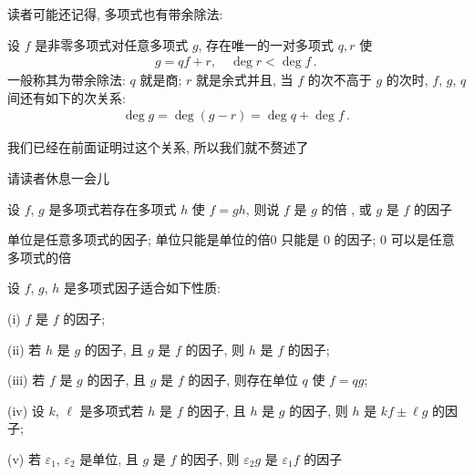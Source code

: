 读者可能还记得, 多项式也有带余除法:

\begin{proposition}
    设 $f$ 是非零多项式\period 对任意多项式 $g$, 存在唯一的一对多项式 $q, r$ 使
    \begin{align*}
        g = q f + r, \quad \deg r < \deg f \period
    \end{align*}
    一般称其为带余除法: $q$ 就是商; $r$ 就是余式\period 并且, 当 $f$ 的次不高于 $g$ 的次时, $f$, $g$, $q$ 间还有如下的次关系:
    \begin{align*}
        \deg g = \deg (g - r) = \deg q + \deg f \period
    \end{align*}
\end{proposition}

我们已经在前面证明过这个关系, 所以我们就不赘述了\period

请读者休息一会儿\period

\myLine

\begin{definition}
    设 $f$, $g$ 是多项式\period 若存在多项式 $h$ 使 $f=gh$, 则说 $f$ 是 $g$ 的倍 , 或 $g$ 是 $f$ 的因子 \period
\end{definition}

\begin{example}
    单位是任意多项式的因子; 单位只能是单位的倍\period $0$ 只能是 $0$ 的因子; $0$ 可以是任意多项式的倍\period
\end{example}

\begin{proposition}
    设 $f$, $g$, $h$ 是多项式\period 因子适合如下性质:

    (i) $f$ 是 $f$ 的因子;

    (ii) 若 $h$ 是 $g$ 的因子, 且 $g$ 是 $f$ 的因子, 则 $h$ 是 $f$ 的因子;

    (iii) 若 $f$ 是 $g$ 的因子, 且 $g$ 是 $f$ 的因子, 则存在单位 $q$ 使 $f = qg$;

    (iv) 设 $k$, $\ell$ 是多项式\period 若 $h$ 是 $f$ 的因子, 且 $h$ 是 $g$ 的因子, 则 $h$ 是 $kf \pm \ell g$ 的因子;

    (v) 若 $\varepsilon_1$, $\varepsilon_2$ 是单位, 且 $g$ 是 $f$ 的因子, 则 $\varepsilon_2 g$ 是 $\varepsilon_1 f$ 的因子\period
\end{proposition}

